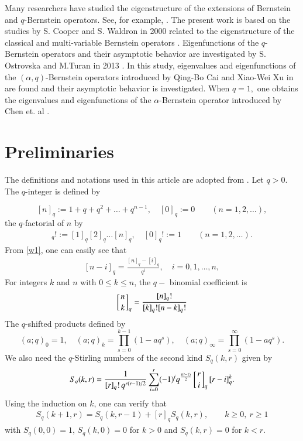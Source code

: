 \documentclass[12pt]{article}
\numberwithin{equation}{section} \theoremstyle{plain}
\theoremstyle{definition}
\theoremstyle{remark}
\newcommand{\qbinom}[2]{\left[\genfrac{}{}{0pt}{}{#1}{#2}\right]_{q}}
\begin{document}
Many researchers have studied the eigenstructure of the extensions of Bernstein and $q$-Bernstein operators. See, for example, \cite{goska2, goska, margareta,  kernel, wng}. The present work is based on the studies by S. Cooper and S. Waldron in 2000 related to the eigenstructure of the classical and multi-variable Bernstein operators \cite{waldron, waldron2}. Eigenfunctions of the $q$-Bernstein operators and their asymptotic behavior are investigated by S. Ostrovska and M.Turan in 2013 \cite{memocan}. In this study, eigenvalues and eigenfunctions of the $(\alpha,q)$-Bernstein operators introduced by Qing-Bo Cai and Xiao-Wei Xu in \cite{qingbo} are found and their asymptotic behavior is investigated. When $q=1,$ one obtains the eigenvalues and eigenfunctions of the $\alpha$-Bernstein operator introduced by Chen et. al \cite{xia}.



\section{Preliminaries}

The definitions and notations used in this article are adopted from \cite[Ch.10]{askey}.
Let $q>0.$ The $q$-integer is defined by

\begin{equation}\label{w1}
[n]_q:=1+q+q^2+\dots+q^{n-1},\quad [0]_q:=0 \qquad(n=1,2,\dots),
\end{equation} 
the $q$-factorial of $n$ by
\begin{align*}
[n]_q!:=[1]_q[2]_q\dots [n]_q,\quad[0]_q!:=1 \qquad(n=1,2,\dots).
\end{align*} 
From \eqref{w1}, one can easily see that 
\begin{eqnarray}\label{prop1}
[n-i]_q=\frac{[n]_q-[i]_q}{q^i}, \quad i=0,1,\ldots,n,
\end{eqnarray}
For integers $k$ and $n$ with $0\leq k\leq n$, the $q-$ binomial coefficient is 
\begin{equation*}
\qbinom{n}{k}=\frac{[n]_q!}{[k]_q![n-k]_q!}
\end{equation*}
The $q$-shifted products defined by
$$(a;q)_0=1, \quad (a;q)_k=\prod_{s=0}^{k-1}(1-aq^s),\quad (a;q)_\infty=\prod_{s=0}^{\infty}(1-aq^s).$$
We also need the $q$-Stirling numbers of the second kind 
$S_q(k,r)$ given by
\begin{align}\label{str1}
S_q(k,r)=\frac{1}{[r]_q!\, q^{r(r-1)/2}}\sum_{i=0}^r(-1)^iq^{\frac{i(i-1)}{2}}\qbinom{r}{i}[r-i]_q^k.
\end{align}
Using the induction on $k$, one can verify that 
\begin{align}\label{str2}
S_q(k+1,r)=S_q(k,r-1)+[r]_qS_q(k,r), \qquad k\geq0,\: r\geq1
\end{align}
with $S_q(0,0)=1$, $S_q(k,0)=0$ for $k>0$ and $S_q(k,r)=0$ for $k<r.$
\end{document}
